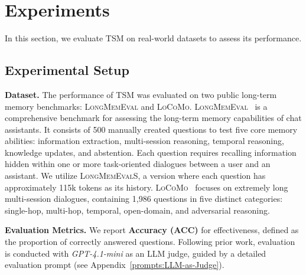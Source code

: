 \documentclass[11pt]{article}
\newcommand{\longmemeval}[1]{\textsc{LongMemEval}}
\newcommand{\ours}[1]{TSM}
\begin{document}



\section{Experiments}


In this section, we evaluate \ours{} on real-world datasets to assess its performance. 
\subsection{Experimental Setup}

\noindent \textbf{Dataset.} The performance of \ours{} was evaluated on two public long-term memory benchmarks: \textsc{LongMemEval} and \textsc{LoCoMo}.
\textsc{LongMemEval}~\cite{wu_longmemeval_2025} is a comprehensive benchmark for assessing the long-term memory capabilities of chat assistants. It consists of 500 manually created questions to test five core memory abilities: information extraction, multi-session reasoning, temporal reasoning, knowledge updates, and abstention. Each question requires recalling information hidden within one or more task-oriented dialogues between a user and an assistant.
We utilize \textsc{\longmemeval\_S}, a version where each question has approximately 115k tokens as its history. 
\textsc{LoCoMo}~\cite{maharana_evaluating_2024} focuses on extremely long multi-session dialogues, containing 1,986 questions in five distinct categories: single-hop, multi-hop, temporal, open-domain, and adversarial reasoning.


\noindent \textbf{Evaluation Metrics.}
We report \textbf{Accuracy (ACC)} for effectiveness, defined as the proportion of correctly answered questions. %
Following prior work, evaluation is conducted with \emph{GPT-4.1-mini} as an LLM judge, guided by a detailed evaluation prompt (see Appendix~\ref{prompts:LLM-as-Judge}). %
\end{document}
